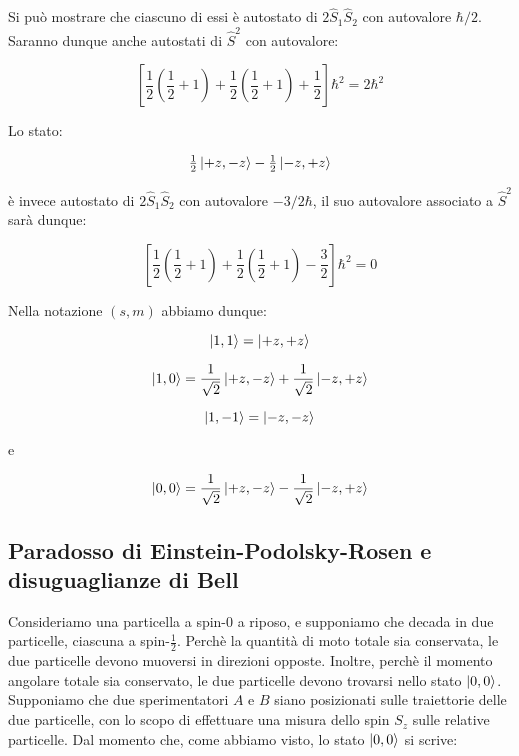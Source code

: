 Si pu\`o mostrare che ciascuno di essi \`e autostato di $2 \hat{S}_1 \hat{S}_2$ con autovalore $\hbar / 2$. Saranno dunque anche autostati di $\hat{S}^2$ con autovalore:

	\begin{equation}
		\left [	\frac{1}{2} \left ( \frac{1}{2} + 1 \right ) + \frac{1}{2} \left ( \frac{1}{2} + 1 \right ) + \frac{1}{2} \right ] \hbar^2 = 2 \hbar^2
	\end{equation}

Lo stato:

	\begin{equation}
		\begin{array}{c}
			\frac{1}{2} \ket{+z, -z} - \frac{1}{2} \ket{-z, +z}
		\end{array}
	\end{equation}

\`e invece autostato di $2 \hat{S}_1 \hat{S}_2$ con autovalore $-3/2 \hbar$, il suo autovalore associato a $\hat{S}^2$ sar\`a dunque:

	\begin{equation}
		\left [	\frac{1}{2} \left ( \frac{1}{2} + 1 \right ) + \frac{1}{2} \left ( \frac{1}{2} + 1 \right ) - \frac{3}{2} \right ] \hbar^2 = 0
	\end{equation}

Nella notazione $(s, m)$ abbiamo dunque:

	\begin{equation}
		\ket{1, 1} = \ket{+z, +z}
	\end{equation}

	\begin{equation}
		\ket{1, 0} = \frac{1}{\sqrt{2}} \ket{+z, -z} + \frac{1}{\sqrt{2}} \ket{-z, +z}
	\end{equation}

	\begin{equation}
		\ket{1, -1} = \ket{-z, -z}
	\end{equation}

e

	\begin{equation}
		\ket{0, 0} = \frac{1}{\sqrt{2}} \ket{+z, -z} - \frac{1}{\sqrt{2}} \ket{-z, +z}
	\end{equation}

\subsection{Paradosso di Einstein-Podolsky-Rosen e disuguaglianze di Bell}

	Consideriamo una particella a spin-0 a riposo, e supponiamo che decada in due particelle, ciascuna a spin-$\tfrac{1}{2}$. Perch\`e la quantit\`a di moto totale sia conservata, le due particelle devono muoversi in direzioni opposte. Inoltre, perch\`e il momento angolare totale sia conservato, le due particelle devono trovarsi nello stato $\ket{0, 0}$. Supponiamo che due sperimentatori $A$ e $B$ siano posizionati sulle traiettorie delle due particelle, con lo scopo di effettuare una misura dello spin $S_z$ sulle relative particelle.
Dal momento che, come abbiamo visto, lo stato $\ket{0, 0}$ si scrive:

